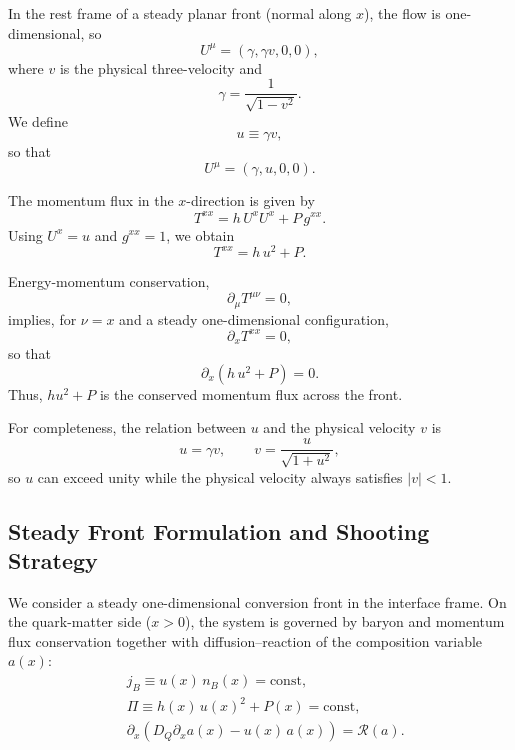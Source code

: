 \documentclass[11pt]{article}
\begin{document}
In the rest frame of a steady planar front (normal along $x$), the flow is one-dimensional, so
\begin{equation}
U^\mu = (\gamma, \gamma v, 0, 0),
\end{equation}
where $v$ is the physical three-velocity and
\begin{equation}
\gamma = \frac{1}{\sqrt{1 - v^2}}.
\end{equation}
We define
\begin{equation}
u \equiv \gamma v,
\end{equation}
so that
\begin{equation}
U^\mu = (\gamma, u, 0, 0).
\end{equation}

The momentum flux in the $x$-direction is given by
\begin{equation}
T^{xx} = h\,U^x U^x + P\,g^{xx}.
\end{equation}
Using $U^x = u$ and $g^{xx} = 1$, we obtain
\begin{equation}
\boxed{
T^{xx} = h\,u^2 + P.
}
\end{equation}

Energy-momentum conservation,
\begin{equation}
\partial_\mu T^{\mu\nu} = 0,
\end{equation}
implies, for $\nu = x$ and a steady one-dimensional configuration,
\begin{equation}
\partial_x T^{xx} = 0,
\end{equation}
so that
\begin{equation}
\boxed{
\partial_x \left(h\,u^2 + P\right) = 0.
}
\end{equation}
Thus, $h u^2 + P$ is the conserved momentum flux across the front.

For completeness, the relation between $u$ and the physical velocity $v$ is
\begin{equation}
u = \gamma v,
\qquad
v = \frac{u}{\sqrt{1 + u^2}},
\end{equation}
so $u$ can exceed unity while the physical velocity always satisfies $|v| < 1$.


\subsection*{Steady Front Formulation and Shooting Strategy}

We consider a steady one-dimensional conversion front in the interface frame. 
On the quark-matter side ($x>0$), the system is governed by baryon and momentum flux conservation together with diffusion--reaction of the composition variable $a(x)$:
\begin{align}
& j_B \equiv u(x)\,n_B(x) = \text{const}, \\
& \Pi \equiv h(x)\,u(x)^2 + P(x) = \text{const}, \\
& \partial_x \!\left( D_Q \partial_x a(x) - u(x)\,a(x) \right) = \mathcal{R}(a).
\end{align}
\end{document}
